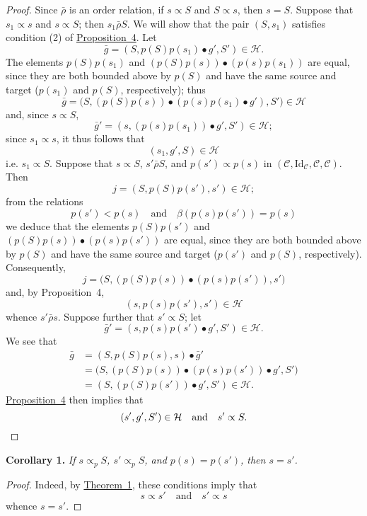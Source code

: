 \documentclass[a4paper,oneside,nobib,nofonts,notitlepage,notoc,nols,fleqn,justified]{tufte-book}
\newenvironment{itenv}[1]
  {\phantomsection\par\medskip\noindent\textbf{#1.}\itshape}
  {\par\medskip}
\newcommand{\oldpage}[1]{{\reversemarginpar\marginnote{\raggedleft\footnotesize\textit{p.~#1}}}}
\newcommand{\CC}{\mathcal{C}}
\newcommand{\HH}{\mathcal{H}}
\newcommand{\relrhobar}{\mathrel{\bar{\rho}}}
\newcommand{\subs}{\mathrel{\propto}}
\newcommand{\Id}{\mathrm{Id}}
\begin{document}
\begin{proof}
  Since $\relrhobar$ is an order relation, if $s\subs S$ and $S\subs s$, then $s=S$.
  Suppose that $s_1\subs s$ and $s\subs S$;
  then $s_1\relrhobar S$.
  We will show that the pair $(S,s_1)$ satisfies condition (2\textquotesingle) of \hyperref[proposition:4]{Proposition~4}.
  Let
  \[
    \bar{g}
    = (S,p(S)p(s_1)\bullet g',S')
    \in\HH.
  \]
  The elements $p(S)p(s_1)$ and $(p(S)p(s))\bullet(p(s)p(s_1))$ are equal, since they are both bounded above by $p(S)$ and have the same source and target ($p(s_1)$ and $p(S)$, respectively);
  thus
  \[
    \bar{g}
    = \big(S,(p(S)p(s))\bullet(p(s)p(s_1)\bullet g'),S'\big)
    \in\HH
  \]
  and, since $s\subs S$,
  \[
    \bar{g}'
    = (s,(p(s)p(s_1))\bullet g', S')
    \in\HH;
  \]
  since $s_1\subs s$, it thus follows that
  \[
    (s_1,g',S)
    \in\HH
  \]
  i.e. $s_1\subs S$.
  Suppose that $s\subs S$, $s'\relrhobar S$, and $p(s')\subs p(s)$ in $(\CC,\Id_\CC,\CC,\CC)$.
  Then
  \[
    j
    = (S,p(S)p(s'),s')
    \in\HH;
  \]
  from the relations
  \[
    p(s') < p(s)
    \quad\text{and}\quad
    \beta(p(s)p(s')) = p(s)
  \]
  we deduce that the elements $p(S)p(s')$ and $(p(S)p(s))\bullet(p(s)p(s'))$ are equal, since they are both bounded above by $p(S)$ and have the same source and target ($p(s')$ and $p(S)$, respectively).
  Consequently,
  \[
    j
    = \big(S,(p(S)p(s))\bullet(p(s)p(s')),s'\big)
  \]
  and, by Proposition~4,
  \[
    (s,p(s)p(s'),s')
    \in\HH
  \]
  whence $s'\relrhobar s$.
  Suppose further that $s'\subs S$;
  let
  \[
    \bar{g}'
    = (s,p(s)p(s')\bullet g',S')
    \in\HH.
  \]
  We see that
  \[
    \begin{aligned}
      \bar{g}
      &= (S,p(S)p(s),s)\bullet\bar{g}'
    \\&= \big(S,(p(S)p(s))\bullet(p(s)p(s'))\bullet g',S'\big)
    \\&= (S,(p(S)p(s'))\bullet g',S')
    \in\HH.
    \end{aligned}
  \]
  \oldpage{363}
  \hyperref[proposition:4]{Proposition~4} then implies that
  \[
    (s',g',S')\in\HH
    \quad\text{and}\quad
    s'\subs S.
    \qedhere
  \]
\end{proof}

\begin{itenv}{Corollary 1}
  If $s\subs_p S$, $s'\subs_p S$, and $p(s)=p(s')$, then $s=s'$.
\end{itenv}

\begin{proof}
  Indeed, by \hyperref[theorem:1]{Theorem~1}, these conditions imply that
  \[
    s\subs s'
    \quad\text{and}\quad
    s'\subs s
  \]
  whence $s=s'$.
\end{proof}
\end{document}
